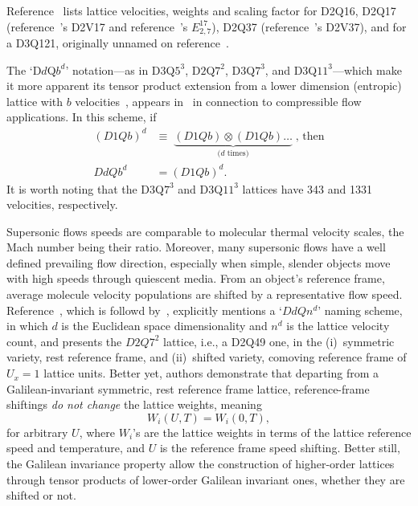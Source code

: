     Reference~\cite{2014-MengJ+ZhangY-JComputPhys} lists lattice  velocities,  weights  and  scaling  factor  for  D2Q16,  D2Q17
    (reference~\cite{2007-SiebertDN+PhilippiPC-IntJModPhysC}'s D2V17 and reference~\cite{2010-ShanX-PhysRevE}'s $E_{2,7}^{17}$),
    D2Q37   (reference~\cite{2006-PhilippiPC+SurmasR-PhysRevE}'s   D2V37),   and   for   a   D3Q121,   originally   unnamed   on
    reference~\cite{2008-NieX+ChenH-PhysRevE}.

    The `D$d$Q$b^d$' notation---as in D$3$Q$5^3$, D$2$Q$7^2$, D$3$Q$7^3$, and D$3$Q$11^3$---which  make  it  more  apparent  its
    tensor     product      extension      from      a      lower      dimension      (entropic)      lattice      with      $b$
    velocities~\cite{2006-ChikatamarlaSS+KarlinIV-PhysRevLett},        appears        in~\cite{2015-FrapolliN+KarlinIV-PhysRevE,
    2016-FrapolliN+KarlinIV-PhysRevE} in connection to compressible flow applications. In this scheme, if
    \begin{align}
        (D1Qb)^d & \equiv \;\underbrace{(D1Qb) \otimes (D1Qb) \ldots}_{\mbox{($d$ times)}}\;\mbox{, then} \\
        DdQb^d   & = (D1Qb)^d.
    \end{align}
    It is worth noting that the D$3$Q$7^3$ and D$3$Q$11^3$ lattices have 343 and 1331 velocities, respectively.

    Supersonic flows speeds are comparable to molecular thermal velocity scales, the Mach number being  their  ratio.  Moreover,
    many supersonic flows have a well defined prevailing flow direction, especially when simple, slender objects move with  high
    speeds through quiescent media. From an object's reference frame, average molecule velocity populations  are  shifted  by  a
    representative     flow     speed.     Reference~\cite{2016-FrapolliN+KarlinIV-PhysRevLett},      which      is      followd
    by~\cite{2020-FrapolliN+KarlinIV-Entropy}, explicitly mentions a `$DdQn^d$' naming scheme, in which  $d$  is  the  Euclidean
    space dimensionality and $n^d$ is the lattice velocity count, and presents the $D2Q7^2$ lattice, i.e., a D2Q49 one,  in  the
    (i)~symmetric variety, rest reference frame, and (ii)~shifted variety, comoving reference frame of $U_x = 1$ lattice  units.
    Better yet, authors  demonstrate  that  departing  from  a  Galilean-invariant  symmetric,  rest  reference  frame  lattice,
    reference-frame shiftings \emph{do not change} the lattice weights, meaning
    \begin{equation}
        W_i(U, T) = W_i(0, T),
    \end{equation}
    \noindent for arbitrary $U$, where $W_i$'s are the lattice weights in terms of the lattice reference speed and  temperature,
    and $U$ is the reference frame speed shifting. Better still, the Galilean invariance  property  allow  the  construction  of
    higher-order lattices through tensor products of lower-order Galilean invariant ones, whether they are shifted or not.


